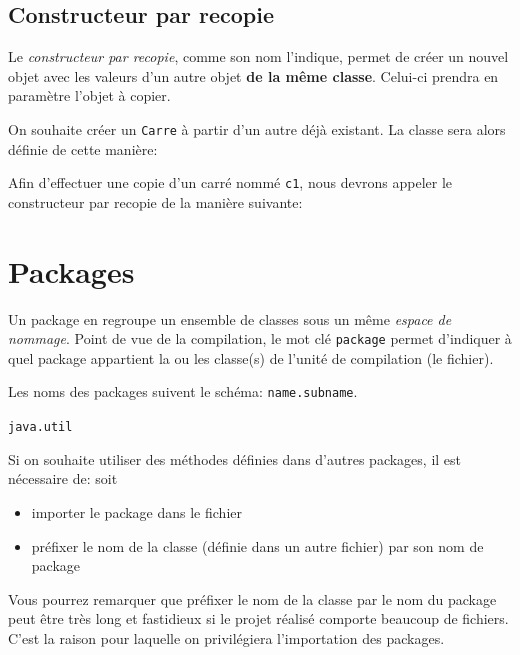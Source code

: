 		
		\subsection{Constructeur par recopie}
		
			Le \emph{constructeur par recopie}, comme son nom l'indique, permet de créer un nouvel objet avec les valeurs d'un autre objet \textbf{de la même classe}.
			Celui-ci prendra en paramètre l'objet à copier.
			
			\begin{exemple}
				On souhaite créer un \lstinline|Carre| à partir d'un autre déjà existant.
				La classe sera alors définie de cette manière:
				
				
				Afin d'effectuer une copie d'un carré nommé \lstinline|c1|, nous devrons appeler le constructeur par recopie de la manière suivante:
				
				
			\end{exemple}
		
	\section{Packages}
	
		Un package en \lang{} regroupe un ensemble de classes sous un même \emph{espace de nommage}.
		Point de vue de la compilation, le mot clé \lstinline|package| permet d'indiquer à quel package appartient la ou les classe(s) de l'unité de compilation (le fichier).
		
		
		Les noms des packages suivent le schéma: \lstinline|name.subname|.
		
		\begin{exemple}
			\lstinline|java.util|
		\end{exemple}
	
		Si on souhaite utiliser des méthodes définies dans d'autres packages, il est nécessaire de: soit
		\begin{itemize}
			\item importer le package dans le fichier
			\item préfixer le nom de la classe (définie dans un autre fichier) par son nom de package
		\end{itemize}
	
		\begin{remarque}
			Vous pourrez remarquer que préfixer le nom de la classe par le nom du package peut être très long et fastidieux si le projet réalisé comporte beaucoup de fichiers. C'est la raison pour laquelle on privilégiera l'importation des packages.
		\end{remarque}
		
